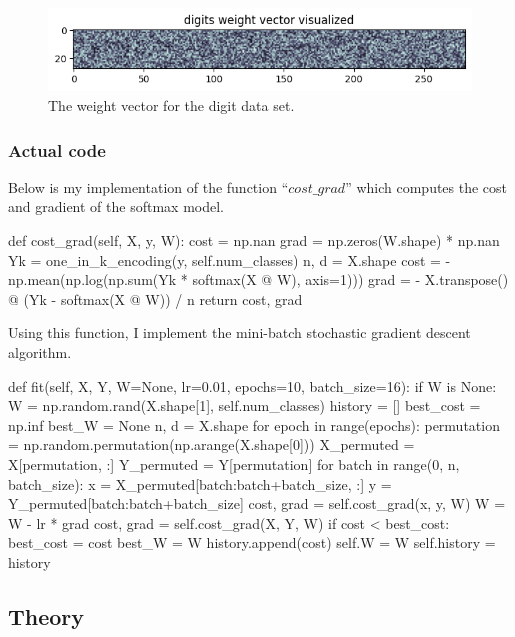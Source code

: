 \documentclass{article}
\begin{document}
\begin{figure}
	\centering
	\includegraphics{softmax_weight_vector}
	\caption{The weight vector for the digit data set.}
\end{figure}
\subsubsection*{Actual code}
Below is my implementation of the function ``$cost\_grad$'' which computes the cost and gradient of the softmax model.
\begin{python}
def cost_grad(self, X, y, W):
	cost = np.nan
	grad = np.zeros(W.shape) * np.nan
	Yk = one_in_k_encoding(y, self.num_classes)
	n, d = X.shape
	cost = - np.mean(np.log(np.sum(Yk * softmax(X @ W), axis=1)))
	grad = - X.transpose() @ (Yk - softmax(X @ W)) / n
	return cost, grad
\end{python}
Using this function, I implement the mini-batch stochastic gradient descent algorithm.
\begin{python}
def fit(self, X, Y, W=None, lr=0.01, epochs=10, batch_size=16):
	if W is None:
		W = np.random.rand(X.shape[1], self.num_classes)
	history = []
	best_cost = np.inf
	best_W = None
	n, d = X.shape
	for epoch in range(epochs):
		permutation = np.random.permutation(np.arange(X.shape[0]))
		X_permuted = X[permutation, :]
		Y_permuted = Y[permutation]
		for batch in range(0, n, batch_size):
			x = X_permuted[batch:batch+batch_size, :]
			y = Y_permuted[batch:batch+batch_size]
			cost, grad = self.cost_grad(x, y, W)
			W = W - lr * grad
		cost, grad = self.cost_grad(X, Y, W)
		if cost < best_cost:
			best_cost = cost
			best_W = W
		history.append(cost)
	self.W = W
	self.history = history
\end{python}
\subsection*{Theory}	
	
\end{document}
